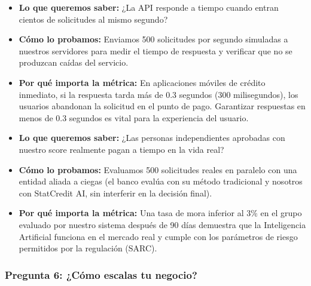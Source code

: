 \documentclass[11pt,a4paper]{article}
\begin{document}
\begin{tcolorbox}[colback=lightgray,colframe=secondary,title=\textbf{Experimento 5.1: Prueba de velocidad y carga del sistema}]
\begin{itemize}[leftmargin=*]
    \item \textbf{Lo que queremos saber:} ¿La API responde a tiempo cuando entran cientos de solicitudes al mismo segundo?
    \item \textbf{Cómo lo probamos:} Enviamos 500 solicitudes por segundo simuladas a nuestros servidores para medir el tiempo de respuesta y verificar que no se produzcan caídas del servicio.
    \item \textbf{Por qué importa la métrica:} En aplicaciones móviles de crédito inmediato, si la respuesta tarda más de 0.3 segundos (300 milisegundos), los usuarios abandonan la solicitud en el punto de pago. Garantizar respuestas en menos de 0.3 segundos es vital para la experiencia del usuario.
\end{itemize}
\end{tcolorbox}

\begin{tcolorbox}[colback=lightgray,colframe=secondary,title=\textbf{Experimento 5.2: Prueba piloto a ciegas con entidad financiera}]
\begin{itemize}[leftmargin=*]
    \item \textbf{Lo que queremos saber:} ¿Las personas independientes aprobadas con nuestro score realmente pagan a tiempo en la vida real?
    \item \textbf{Cómo lo probamos:} Evaluamos 500 solicitudes reales en paralelo con una entidad aliada a ciegas (el banco evalúa con su método tradicional y nosotros con StatCredit AI, sin interferir en la decisión final).
    \item \textbf{Por qué importa la métrica:} Una tasa de mora inferior al 3\% en el grupo evaluado por nuestro sistema después de 90 días demuestra que la Inteligencia Artificial funciona en el mercado real y cumple con los parámetros de riesgo permitidos por la regulación (SARC).
\end{itemize}
\end{tcolorbox}

\subsubsection{Pregunta 6: ¿Cómo escalas tu negocio?}
\end{document}
